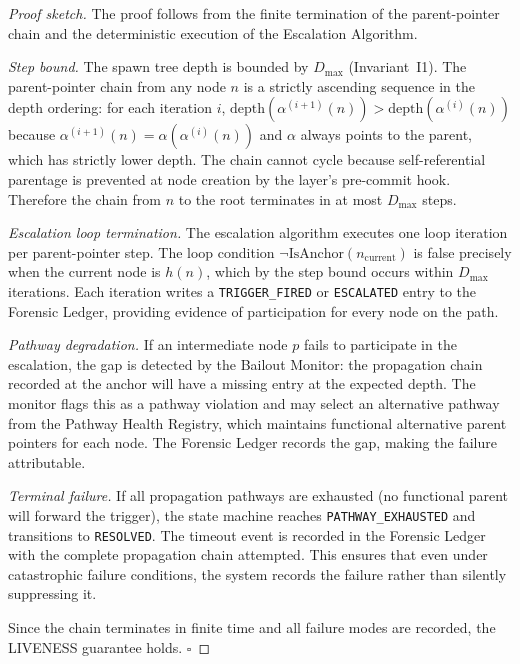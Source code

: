 \begin{proof}[Proof sketch]
The proof follows from the finite termination of the parent-pointer chain and the
deterministic execution of the Escalation Algorithm.

\medskip
\noindent
\textit{Step bound.}  The spawn tree depth is bounded by $D_{\max}$ (Invariant~I1).
The parent-pointer chain from any node $n$ is a strictly ascending sequence in the
depth ordering: for each iteration $i$, $\text{depth}(\alpha^{(i+1)}(n)) >
\text{depth}(\alpha^{(i)}(n))$ because $\alpha^{(i+1)}(n) = \alpha(\alpha^{(i)}(n))$
and $\alpha$ always points to the parent, which has strictly lower depth.  The chain
cannot cycle because self-referential parentage is prevented at node creation by
the \fact{} layer's pre-commit hook.  Therefore the chain from $n$ to the root
terminates in at most $D_{\max}$ steps.

\medskip
\noindent
\textit{Escalation loop termination.}  The escalation algorithm executes one
loop iteration per parent-pointer step.  The loop condition
$\neg\text{IsAnchor}(n_{\text{current}})$ is false precisely when the current
node is $h(n)$, which by the step bound occurs within $D_{\max}$ iterations.
Each iteration writes a \texttt{TRIGGER\_FIRED} or \texttt{ESCALATED} entry to
the Forensic Ledger, providing evidence of participation for every node on the
path.

\medskip
\noindent
\textit{Pathway degradation.}  If an intermediate node $p$ fails to participate
in the escalation, the gap is detected by the Bailout Monitor: the propagation
chain recorded at the anchor will have a missing entry at the expected depth.
The monitor flags this as a pathway violation and may select an alternative
pathway from the Pathway Health Registry, which maintains functional alternative
parent pointers for each node.  The Forensic Ledger records the gap, making the
failure attributable.

\medskip
\noindent
\textit{Terminal failure.}  If all propagation pathways are exhausted (no
functional parent will forward the trigger), the state machine reaches
\texttt{PATHWAY\_EXHAUSTED} and transitions to \texttt{RESOLVED}.  The timeout
event is recorded in the Forensic Ledger with the complete propagation chain
attempted.  This ensures that even under catastrophic failure conditions, the
system records the failure rather than silently suppressing it.

Since the chain terminates in finite time and all failure modes are recorded,
the LIVENESS guarantee holds.  $\square$
\end{proof}

